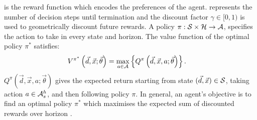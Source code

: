 {\footnotesize \RewardFunc} is the reward function which encodes the preferences of the agent. {\footnotesize \Horizon} represents the number of decision steps until termination and the discount factor {\footnotesize $\gamma \in [0, 1)$} is used to geometrically discount future rewards. A policy {\footnotesize $\pi : \mathcal{S} \times \mathcal{H} \rightarrow \mathcal{A}$}, specifies the action to take in every state and horizon. The value function of the optimal policy {\footnotesize$ \pi^{*} $} satisfies:
{\footnotesize 
    \abovedisplayskip=0pt
    \belowdisplayskip=0pt
    \begin{align}
        \label{eq:opt_vfunc}
        V^{\pi^{*}}\left(\vec{d}, \vec{x}; \vec{\theta}\right) &= \max_{a \in \mathcal{A}} \left\{ Q^{\pi}\left(\vec{d}, \vec{x}, a; \vec{\theta}\right) \right\}.
    \end{align}
}%
{\footnotesize $ Q^{\pi}\left(\vec{d}, \vec{x}, a; \vec{\theta}\right) $} gives the expected return starting from state {\footnotesize $(\vec{d}, \vec{x}) \in \mathcal{S}$}, taking action {\footnotesize $ a \in \mathcal{A}^{h}_{s} $}, and then following policy $ \pi $. In general, an agent's objective is to find an optimal policy {\footnotesize$ \pi^{*} $} which maximises the expected sum of discounted rewards over horizon {\footnotesize \Horizon}.



%

